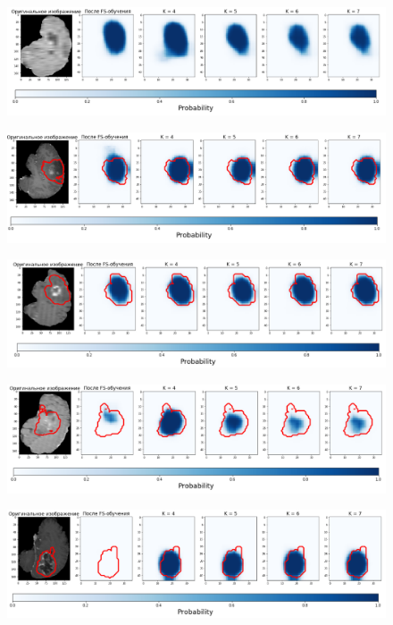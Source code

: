 \begin{figure}[h!] 
  \center
  \includegraphics [scale=0.7] {images/good_3.png}
\end{figure}

\begin{figure}[h!] 
  \center
  \includegraphics [scale=0.7] {images/good_4.png}
\end{figure}


\begin{figure}[h!] 
  \center
  \includegraphics [scale=0.7] {images/good_5.png}
\end{figure}


\begin{figure}[h!] 
  \center
  \includegraphics [scale=0.7] {images/good_6.png}
\end{figure}

\begin{figure}[h!] 
  \center
  \includegraphics [scale=0.7] {images/good_7.png}
\end{figure}

